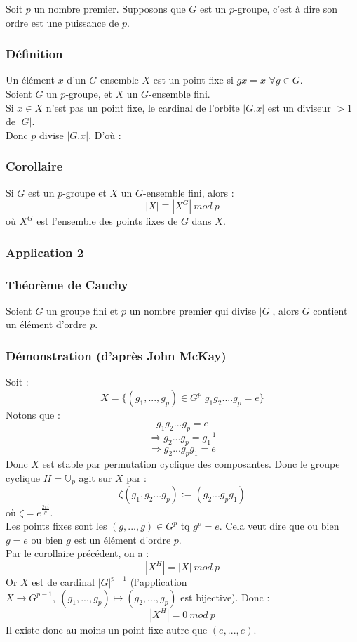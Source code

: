 \documentclass[a4paper, oneside]{report}
\newcommand{\U}{\mathbb{U}}
\newcommand{\cor}{\subsubsection{Corollaire}}
\begin{document}
Soit $p$ un nombre premier. Supposons que $G$ est un $p$-groupe, c'est à dire son ordre est une puissance de $p$.\\
\subsubsection{Définition}
Un élément $x$ d'un $G$-ensemble $X$ est un point fixe si $gx=x$ $\forall g\in G$.\\

Soient $G$ un $p$-groupe, et $X$ un $G$-ensemble fini.\\
Si $x\in X$ n'est pas un point fixe, le cardinal de l'orbite $|G.x|$ est un diviseur $>1$ de $|G|$.\\
Donc $p$ divise $|G.x|$. D'où :

\cor
Si $G$ est un $p$-groupe et $X$ un $G$-ensemble fini, alors :
$$|X| \equiv |X^G|~mod~p$$
où $X^G$ est l'ensemble des points fixes de $G$ dans $X$.

\subsubsection{Application 2}

\subsubsection{Théorème de Cauchy}
Soient $G$ un groupe fini et $p$ un nombre premier qui divise $|G|$, alors $G$ contient un élément d'ordre $p$.

\subsubsection{Démonstration (d'après John McKay)}
Soit :
$$X=\{(g_1,...,g_p)\in G^p | g_1g_2....g_p =e \}$$
Notons que :
$$g_1g_2...g_p = e$$
$$\Rightarrow g_2...g_p=g_1^{-1}$$
$$\Rightarrow g_2...g_pg_1=e$$
Donc $X$ est stable par permutation cyclique des composantes. Donc le groupe cyclique $H=\U_p$ agit sur $X$ par :
$$\zeta(g_1,g_2...g_p) := (g_2...g_pg_1)$$
où $\zeta = e^{\frac{2\pi i}{p}}$.\\
Les points fixes sont les $(g,...,g)\in G^p$ tq $g^p=e$. Cela veut dire que ou bien $g=e$ ou bien $g$ est un élément d'ordre $p$.\\
Par le corollaire précédent, on a :
$$|X^H|=|X|~mod~p$$
Or $X$ est de cardinal $|G|^{p-1}$ (l'application $X \rightarrow G^{p-1},~(g_1,...,g_p)\mapsto (g_2,...,g_p)$ est bijective). Donc :
$$|X^H|=0~mod~p$$
Il existe donc au moins un point fixe autre que $(e,...,e)$.
\end{document}
